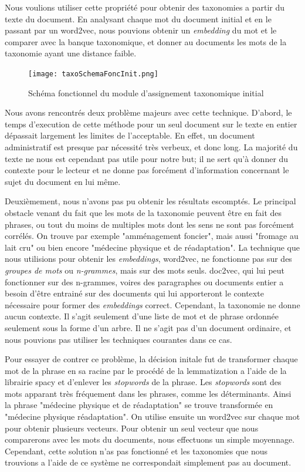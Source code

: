 Nous voulions utiliser cette propriété pour obtenir des taxonomies a partir du texte du document.
En analysant chaque mot du document initial et en le passant par un word2vec, nous pouvions obtenir un \textit{embedding} du mot et le comparer avec la banque taxonomique, et donner au documents les mots de la taxonomie ayant une distance faible. 

\begin{figure}[h!]
  \centering
  \texttt{[image: taxoSchemaFoncInit.png]}
	\caption[]{Schéma fonctionnel du module d'assignement taxonomique initial}
  \label{taxoInit}
\end{figure}


Nous avons rencontrés deux problème majeurs avec cette technique.
D'abord, le temps d'execution de cette méthode pour un seul document sur le texte en entier dépassait largement les limites de l'acceptable.
En effet, un document administratif est presque par nécessité très verbeux, et donc long. La majorité du texte ne nous est cependant pas utile pour notre but; 
il ne sert qu'à donner du contexte pour le lecteur et ne donne pas forcément d'information concernant le sujet du document en lui même. 

Deuxièmement, nous n'avons pas pu obtenir les résultats escomptés.
Le principal obstacle venant du fait que les mots de la taxonomie peuvent être en fait des phrases, ou tout du moins de multiples mots dont les sens ne sont pas forcément corrélés.
On trouve par exemple "amménagement foncier", mais aussi "fromage au lait cru" ou bien encore "médecine physique et de réadaptation".
La technique que nous utilisions pour obtenir les \textit{embeddings}, word2vec, ne fonctionne pas sur des \textit{groupes de mots} ou \textit{n-grammes}, mais sur des mots seuls.
doc2vec, qui lui peut fonctionner sur des n-grammes, voires des paragraphes ou documents entier a besoin d'être entrainé sur des documents qui lui apporteront le contexte nécessaire pour former des \textit{embeddings} correct.
Cependant, la taxonomie ne donne aucun contexte.
Il s'agit seulement d'une liste de mot et de phrase ordonnée seulement sous la forme d'un arbre.
Il ne s'agit pas d'un document ordinaire, et nous pouvions pas utiliser les techniques courantes dans ce cas. 

Pour essayer de contrer ce problème, la décision initale fut de transformer chaque mot de la phrase en sa racine par le procédé de la lemmatization a l'aide de la librairie spacy\cite{spacy} et d'enlever les \textit{stopwords} de la phrase.
Les \textit{stopwords} sont des mots apparant très fréquement dans les phrases, comme les déterminants.
Ainsi la phrase "médecine physique et de réadaptation" se trouve transformée en "médecine physique réadaptation".
On utilise ensuite un word2vec sur chaque mot pour obtenir plusieurs vecteurs. Pour obtenir un seul vecteur que nous comparerons avec les mots du documents, nous effectuons un simple moyennage.
Cependant, cette solution n'as pas fonctionné et les taxonomies que nous trouvions a l'aide de ce système ne correspondait simplement pas au document. 

